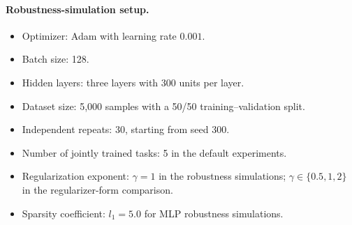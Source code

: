 \documentclass{article}
\begin{document}
\paragraph{Robustness-simulation setup.}
\begin{itemize}
    \item Optimizer: Adam with learning rate $0.001$.
    \item Batch size: 128.
    \item Hidden layers: three layers with 300 units per layer.
    \item Dataset size: 5{,}000 samples with a 50/50 training--validation split.
    \item Independent repeats: 30, starting from seed 300.
    \item Number of jointly trained tasks: 5 in the default experiments.
    \item Regularization exponent: $\gamma=1$ in the robustness simulations; $\gamma\in\{0.5,1,2\}$ in the regularizer-form comparison.
    \item Sparsity coefficient: $l_1=5.0$ for MLP robustness simulations.
\end{itemize}
\end{document}
